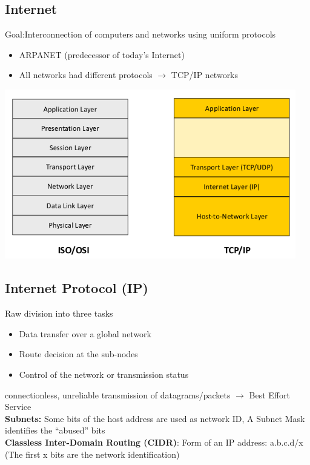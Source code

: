 \documentclass[11pt,ngerman]{article}
\begin{document}
\subsection{Internet}
Goal:Interconnection	of	computers	and	networks	using	uniform	protocols
\begin{itemize}[noitemsep,nolistsep]
	\item ARPANET 	(predecessor	of	today's	Internet)
	\item All networks had different protocols $\rightarrow$ 	TCP/IP	networks
\end{itemize}
\includegraphics[width=5in]{images/Selection_018.png}

\subsection{Internet	Protocol	(IP)}
Raw	division	into	three	tasks
\begin{itemize}[noitemsep,nolistsep]
\item Data	transfer	over	a	global	network
\item Route	decision	at	the	sub-nodes
\item Control	of	the	network	or	transmission	status\\
\end{itemize}
connectionless,	unreliable	transmission	of	
datagrams/packets	$\rightarrow$ Best	Effort Service\\

\noindent \textbf{Subnets:} Some	bits	of	the	host	address	are	used	as	network	ID, 
A	Subnet	Mask	identifies	the	“abused”	bits\\
\textbf{Classless	Inter-Domain	Routing	(CIDR)}: Form	of	an	IP	address:	a.b.c.d/x  (The	first	x	bits	are	the	network	identification)
\end{document}
